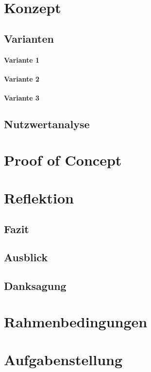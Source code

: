 \documentclass[
11pt, %
a4paper, %
BCOR10mm, %
DIV14, %
footsepline = false, %
headsepline, %
oneside, %
openright,
halfparskip, %
abstracton, %
listof=totocnumbered, %
bibliography=totocnumbered %
]{scrreprt}
\begin{document}
  \chapter{Konzept}\label{chap:konzept}
  \section{Varianten}
  \subsubsection{Variante 1}
  \subsubsection{Variante 2}
  \subsubsection{Variante 3}
  \section{Nutzwertanalyse}
  
  \chapter{Proof of Concept}\label{chap:proof_of_concept}
  
  \chapter{Reflektion}\label{chap:reflektion}
  \section{Fazit}
  \section{Ausblick}
  \section{Danksagung}
  
  \appendix
  
  \chapter{Rahmenbedingungen}
  
  
  \chapter{Aufgabenstellung}\label{chap:aufgabenstellung}
  
  
\end{document}
